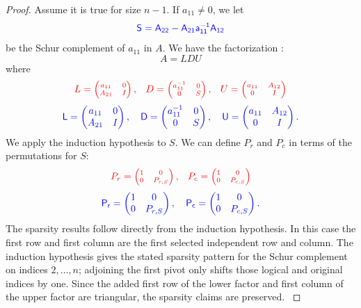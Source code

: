 \documentclass[10pt,twoside]{siamart1116}
\numberwithin{theorem}{section}
\providecommand{\DIFadd}[1]{{\protect\color{blue} \sf #1}} %
\providecommand{\DIFdel}[1]{{\protect\color{red} \scriptsize #1}} %
\providecommand{\DIFaddbegin}{} %
\providecommand{\DIFaddend}{} %
\providecommand{\DIFdelbegin}{} %
\providecommand{\DIFdelend}{} %
\begin{document}
\begin{proof}
  Assume it is true for size $n-1$. If $a_{11} \neq 0$, \DIFdelbegin \DIFdel{we }\DIFdelend \DIFaddbegin \DIFadd{let
  }\[
    \DIFadd{S = A_{22} - A_{21} a_{11}^{-1} A_{12}
  }\]
  \DIFadd{be the Schur complement of $a_{11}$ in $A$. We }\DIFaddend have the factorization
  \DIFdelbegin \DIFdel{:
	}\DIFdelend \[
    A = LDU
  \]
  where
  \DIFdelbegin \[
		\DIFdel{L = \begin{pmatrix}
			a_{11} & 0 \\
			A_{21} & I
		\end{pmatrix}, \quad
		D = \begin{pmatrix}
			a_{11}^{-1} & 0 \\
			0           & S
		\end{pmatrix}, \quad
		U = \begin{pmatrix}
			a_{11} & A_{12} \\
			0      & I
		\end{pmatrix}
	}\]%
\DIFdelend \DIFaddbegin \[
    \DIFadd{L =
    \begin{pmatrix}
      a_{11} & 0 \\
      A_{21} & I
    \end{pmatrix}, \quad
    D =
    \begin{pmatrix}
      a_{11}^{-1} & 0 \\
      0           & S
    \end{pmatrix}, \quad
    U =
    \begin{pmatrix}
      a_{11} & A_{12} \\
      0      & I
    \end{pmatrix}.
  }\]\DIFaddend 
  We apply the induction hypothesis to $S$. We can define $P_r$ and $P_c$ in terms of the permutations for $S$:
  \DIFdelbegin \[ \DIFdel{P_r = \begin{pmatrix}
			1 & 0       \\
			0 & P_{r,S}
		\end{pmatrix}, \quad
		P_c = \begin{pmatrix}
			1 & 0       \\
			0 & P_{c,S}
		\end{pmatrix}
	}\]%
\DIFdelend \DIFaddbegin \[ \DIFadd{P_r =
    \begin{pmatrix}
      1 & 0       \\
      0 & P_{r,S}
    \end{pmatrix}, \quad
    P_c =
    \begin{pmatrix}
      1 & 0       \\
      0 & P_{c,S}
    \end{pmatrix}.
  }\]\DIFaddend 
  \DIFdelbegin \DIFdel{The sparsity results follow directly from the induction hypothesis.
}\DIFdelend \DIFaddbegin \DIFadd{In this case the first row and first column are the first selected independent row and column. The induction hypothesis gives the stated sparsity pattern for the Schur complement on indices $2,\ldots,n$; adjoining the first pivot only shifts those logical and original indices by one. Since the added first row of the lower factor and first column of the upper factor are triangular, the sparsity claims are preserved.
}\DIFaddend 


\end{proof}
\end{document}
